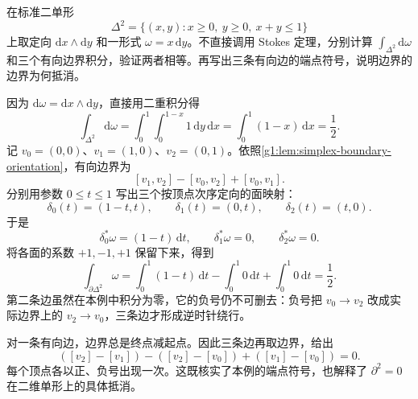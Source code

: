 \begin{exercise}\label{g1:ex:triangle-chain-stokes}
	在标准二单形
	\[
		\Delta^2=\{(x,y):x\ge0,\ y\ge0,\ x+y\le1\}
	\]
	上取定向 \(\mathrm{d}x\wedge\mathrm{d}y\) 和一形式 \(\omega=x\,\mathrm{d}y\)。不直接调用 Stokes 定理，分别计算 \(\int_{\Delta^2}\mathrm{d}\omega\) 和三个有向边界积分，验证两者相等。再写出三条有向边的端点符号，说明边界的边界为何抵消。
\end{exercise}
\begin{solution}
	因为 \(\mathrm{d}\omega=\mathrm{d}x\wedge\mathrm{d}y\)，直接用二重积分得
	\[
		\int_{\Delta^2}\mathrm{d}\omega
		=\int_0^1\int_0^{1-x}1\,\mathrm{d}y\,\mathrm{d}x
		=\int_0^1(1-x)\,\mathrm{d}x=\frac12.
	\]
	记 \(v_0=(0,0)\)、\(v_1=(1,0)\)、\(v_2=(0,1)\)。依照\cref{g1:lem:simplex-boundary-orientation}，有向边界为
	\[
		[v_1,v_2]-[v_0,v_2]+[v_0,v_1].
	\]
	分别用参数 \(0\le t\le1\) 写出三个按顶点次序定向的面映射：
	\[
		\delta_0(t)=(1-t,t),\qquad
		\delta_1(t)=(0,t),\qquad
		\delta_2(t)=(t,0).
	\]
	于是
	\[
		\delta_0^*\omega=(1-t)\,\mathrm{d}t,\qquad
		\delta_1^*\omega=0,\qquad
		\delta_2^*\omega=0.
	\]
	将各面的系数 \(+1,-1,+1\) 保留下来，得到
	\[
		\int_{\partial\Delta^2}\omega
		=\int_0^1(1-t)\,\mathrm{d}t-\int_0^1 0\,\mathrm{d}t+\int_0^1 0\,\mathrm{d}t
		=\frac12.
	\]
	第二条边虽然在本例中积分为零，它的负号仍不可删去：负号把 \(v_0\to v_2\) 改成实际边界上的 \(v_2\to v_0\)，三条边才形成逆时针绕行。

	对一条有向边，边界总是终点减起点。因此三条边再取边界，给出
	\[
		([v_2]-[v_1])-([v_2]-[v_0])+([v_1]-[v_0])=0.
	\]
	每个顶点各以正、负号出现一次。这既核实了本例的端点符号，也解释了 \(\partial^2=0\) 在二维单形上的具体抵消。
\end{solution}

